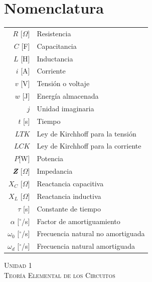\documentclass[11pt,a4paper,twocolumn]{article}
\newcommand{\fasor}[1]{\textit{\textbf{#1}}}
\newcommand{\unidad}[2]{\begin{center}
		\fontsize{10}{10}\selectfont\color{gray!50!black}\scshape Unidad #1 \\
		\fontsize{14}{14}\selectfont \scshape #2
\end{center} \vspace{-.6cm}}
\begin{document}
\pagestyle{fancy}

	\section*{Nomenclatura}
	\begin{tabular}{r l}
		$R$ [$\Omega$] & Resistencia \\
		$C$ [F] & Capacitancia \\
		$L$ [H] & Inductancia \\
		$i$ [A] & Corriente \\
		$v$ [V] & Tensión o voltaje \\
		$w$ [J] & Energía almacenada \\
		$j$ & Unidad imaginaria \\
		$t$ [s] & Tiempo \\
		$LTK$ & Ley de Kirchhoff para la tensión \\
		$LCK$ & Ley de Kirchhoff para la corriente \\
		$P$[W] & Potencia \\
		$\fasor{Z}$ [$\Omega$]& Impedancia \\
		$X_{C}$ [$\Omega$] & Reactancia capacitiva \\
		$X_{L}$ [$\Omega$] & Reactancia inductiva \\
		$\tau$ [s] & Constante de tiempo \\
		$\alpha$ [$^\circ$/s]& Factor de amortiguamiento \\
		$\omega_{0}$ [$^\circ$/s] & Frecuencia natural no amortiguada \\
		$\omega_{d}$ [$^\circ$/s] & Frecuencia natural amortiguada \\
	\end{tabular}


	\unidad{1}{Teoría Elemental de los Circuitos}
	
\end{document}
